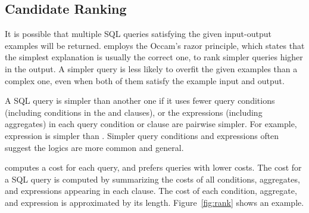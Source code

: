 \subsection{Candidate Ranking}
\label{sec:ranking}

\vspace{-1mm}

It is possible that multiple SQL queries satisfying
the given input-output examples will be returned.
\ourtool employs the Occam's razor principle,
which states that the simplest explanation is
usually the correct one, to rank simpler queries higher in
the output.
A simpler query is less likely to overfit the given examples
than a complex one, even when both of them
satisfy the example input and output.


A SQL query is simpler than another one if it uses
fewer query conditions (including conditions in the 
and  clauses), or the expressions (including
aggregates) in each query condition or clause are pairwise simpler.
For example, expression  is simpler than
.
Simpler query conditions and expressions often suggest the
logics are more common and general.

\ourtool computes a cost for each
query, and prefers queries with lower costs. The cost
for a SQL query is computed by summarizing
the costs of all conditions, aggregates,
and expressions
appearing in each clause. %
The cost of each condition, aggregate, and expression
is approximated by its length.
Figure~\ref{fig:rank} shows an example.


